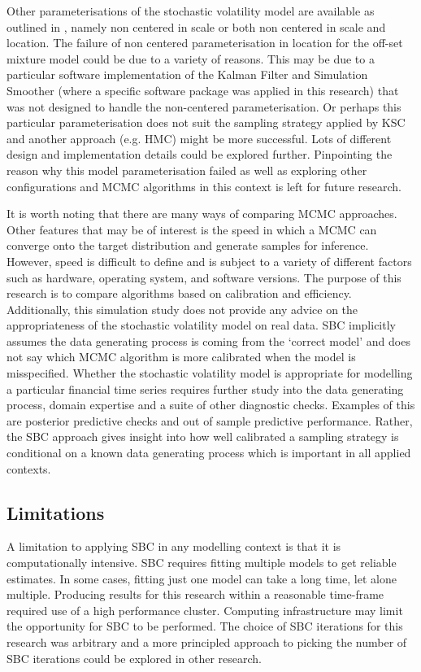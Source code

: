 \documentclass[12pt, a4paper]{article}
\begin{document}
Other parameterisations of the stochastic volatility model are available as outlined in \citet{strickland2008parameterisation}, namely non centered in scale or both non centered in scale and location. The failure of non centered parameterisation in location for the off-set mixture model could be due to a variety of reasons. This may be due to a particular software implementation of the Kalman Filter and Simulation Smoother (where a specific software package was applied in this research) that was not designed to handle the non-centered parameterisation. Or perhaps this particular parameterisation does not suit the sampling strategy applied by KSC and another approach (e.g. HMC) might be more successful. Lots of different design and implementation details could be explored further. Pinpointing the reason why this model parameterisation failed as well as exploring other configurations and MCMC algorithms in this context is left for future research.

It is worth noting that there are many ways of comparing MCMC approaches. Other features that may be of interest is the speed in which a MCMC can converge onto the target distribution and generate samples for inference. However, speed is difficult to define and is subject to a variety of different factors such as hardware, operating system, and software versions. The purpose of this research is to compare algorithms based on calibration and efficiency. Additionally, this simulation study does not provide any advice on the appropriateness of the stochastic volatility model on real data. SBC implicitly assumes the data generating process is coming from the `correct model' and does not say which MCMC algorithm is more calibrated when the model is misspecified. Whether the stochastic volatility model is appropriate for modelling a particular financial time series requires further study into the data generating process, domain expertise and a suite of other diagnostic checks. Examples of this are posterior predictive checks and out of sample predictive performance. Rather, the SBC approach gives insight into how well calibrated a sampling strategy is conditional on a known data generating process which is important in all applied contexts.  


\subsection{Limitations}
A limitation to applying SBC in any modelling context is that it is computationally intensive. SBC requires fitting multiple models to get reliable estimates. In some cases, fitting just one model can take a long time, let alone multiple. Producing results for this research within a reasonable time-frame required use of a high performance cluster. Computing infrastructure may limit the opportunity for SBC to be performed. The choice of SBC iterations for this research was arbitrary and a more principled approach to picking the number of SBC iterations could be explored in other research.
\end{document}
